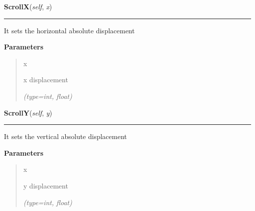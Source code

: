 \hspace{.8\funcindent}\begin{boxedminipage}{\funcwidth}

    \raggedright \textbf{ScrollX}(\textit{self}, \textit{x})

    \vspace{-1.5ex}

    \rule{\textwidth}{0.5\fboxrule}
\setlength{\parskip}{2ex}
    It sets the horizontal absolute displacement

\setlength{\parskip}{1ex}
      \textbf{Parameters}
      \vspace{-1ex}

      \begin{quote}
        \begin{Ventry}{x}

          \item[x]

          x displacement

            {\it (type=int, float)}

        \end{Ventry}

      \end{quote}

    \end{boxedminipage}

    \label{ImagePanel:ImagePanel:ScrollY}

    \vspace{0.5ex}

\hspace{.8\funcindent}\begin{boxedminipage}{\funcwidth}

    \raggedright \textbf{ScrollY}(\textit{self}, \textit{y})

    \vspace{-1.5ex}

    \rule{\textwidth}{0.5\fboxrule}
\setlength{\parskip}{2ex}
    It sets the vertical absolute displacement

\setlength{\parskip}{1ex}
      \textbf{Parameters}
      \vspace{-1ex}

      \begin{quote}
        \begin{Ventry}{x}

          \item[y]

          y displacement

            {\it (type=int, float)}

        \end{Ventry}

      \end{quote}

    \end{boxedminipage}


